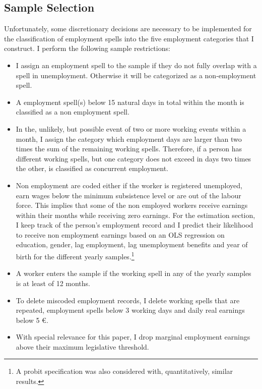 \documentclass[12pt, a4paper]{article}
\let\Oldsubsection\subsection
\renewcommand{\subsection}{\FloatBarrier\Oldsubsection}
\begin{document}
\subsection{Sample Selection\label{Sec: samp_select}}

Unfortunately, some discretionary decisions are necessary to be implemented for the classification of employment spells into the five employment categories that I construct. I perform the following sample restrictions:
\begin{itemize}
\item  I assign an employment spell to the sample if they do not fully overlap with a spell in unemployment. Otherwise it will be categorized as a non-employment spell.
\item A employment spell(s) below 15 natural days in total within the month is classified as a non employment spell. 
\item In the, unlikely, but possible event of two or more working events within a month, I assign the category which employment days are larger than two times the sum of the remaining working spells. Therefore, if a person has different working spells, but one category does not exceed in days two times the other, is classified as concurrent employment. 
\item Non employment are coded either if the worker is registered unemployed, earn wages below the minimum subsistence level or are out of the labour force. This implies that some of the non employed workers receive earnings within their months while receiving zero earnings. For the estimation section, I keep track of the person's employment record and I predict their likelihood to receive non employment earnings based on an OLS regression on education, gender, lag employment, lag unemployment benefits and year of birth for the different yearly samples.\footnote{A probit specification was also considered with, quantitatively, similar results.}
\item A worker enters the sample if the working spell in any of the yearly samples is at least of 12 months. 
\item To delete miscoded employment records, I delete working spells that are repeated, employment spells below 3 working days and daily real earnings below 5 \euro.
\item With special relevance for this paper, I drop marginal employment earnings above their maximum legislative threshold.
\end{itemize}
\end{document}
